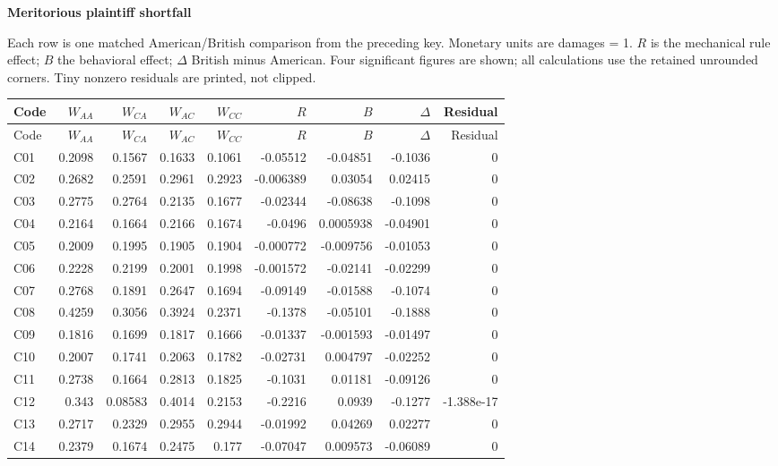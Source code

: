 \documentclass[10pt]{article}
\begin{document}
\newpage
{\LARGE\bfseries Meritorious plaintiff shortfall}\par\medskip
Each row is one matched American/British comparison from the preceding key. Monetary units are damages = 1. $R$ is the mechanical rule effect; $B$ the behavioral effect; $\Delta$ British minus American. Four significant figures are shown; all calculations use the retained unrounded corners. Tiny nonzero residuals are printed, not clipped.\par\medskip
\small\setlength{\tabcolsep}{6pt}\begin{longtable}{@{}lrrrrrrrr@{}}
\toprule Code & $W_{AA}$ & $W_{CA}$ & $W_{AC}$ & $W_{CC}$ & $R$ & $B$ & $\Delta$ & Residual\\\midrule\endfirsthead
\toprule Code & $W_{AA}$ & $W_{CA}$ & $W_{AC}$ & $W_{CC}$ & $R$ & $B$ & $\Delta$ & Residual\\\midrule\endhead\bottomrule\endfoot
C01 & 0.2098 & 0.1567 & 0.1633 & 0.1061 & -0.05512 & -0.04851 & -0.1036 & 0\\[1pt]
C02 & 0.2682 & 0.2591 & 0.2961 & 0.2923 & -0.006389 & 0.03054 & 0.02415 & 0\\[1pt]
C03 & 0.2775 & 0.2764 & 0.2135 & 0.1677 & -0.02344 & -0.08638 & -0.1098 & 0\\[1pt]
C04 & 0.2164 & 0.1664 & 0.2166 & 0.1674 & -0.0496 & 0.0005938 & -0.04901 & 0\\[1pt]
C05 & 0.2009 & 0.1995 & 0.1905 & 0.1904 & -0.000772 & -0.009756 & -0.01053 & 0\\[1pt]
C06 & 0.2228 & 0.2199 & 0.2001 & 0.1998 & -0.001572 & -0.02141 & -0.02299 & 0\\[1pt]
C07 & 0.2768 & 0.1891 & 0.2647 & 0.1694 & -0.09149 & -0.01588 & -0.1074 & 0\\[1pt]
C08 & 0.4259 & 0.3056 & 0.3924 & 0.2371 & -0.1378 & -0.05101 & -0.1888 & 0\\[1pt]
C09 & 0.1816 & 0.1699 & 0.1817 & 0.1666 & -0.01337 & -0.001593 & -0.01497 & 0\\[1pt]
C10 & 0.2007 & 0.1741 & 0.2063 & 0.1782 & -0.02731 & 0.004797 & -0.02252 & 0\\[1pt]
C11 & 0.2738 & 0.1664 & 0.2813 & 0.1825 & -0.1031 & 0.01181 & -0.09126 & 0\\[1pt]
C12 & 0.343 & 0.08583 & 0.4014 & 0.2153 & -0.2216 & 0.0939 & -0.1277 & -1.388e-17\\[1pt]
C13 & 0.2717 & 0.2329 & 0.2955 & 0.2944 & -0.01992 & 0.04269 & 0.02277 & 0\\[1pt]
C14 & 0.2379 & 0.1674 & 0.2475 & 0.177 & -0.07047 & 0.009573 & -0.06089 & 0\\[1pt]

\end{longtable}
\end{document}

